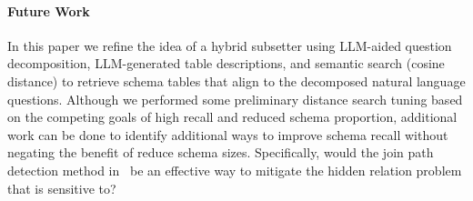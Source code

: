 \paragraph{\textbf{Future Work}}

In this paper we refine the idea of a hybrid subsetter using LLM-aided question decomposition, LLM-generated table descriptions, and semantic search (cosine distance) to retrieve schema tables that align to the decomposed natural language questions.
Although we performed some preliminary distance search tuning based on the competing goals of high recall and reduced schema proportion, additional work can be done to identify additional ways to improve schema recall without negating the benefit of reduce schema sizes. 
Specifically, would the join path detection method in~\cite{Katsogiannis-Meimarakis2026} be an effective way to mitigate the hidden relation problem that \PROJECTNAME{ }is sensitive to?
